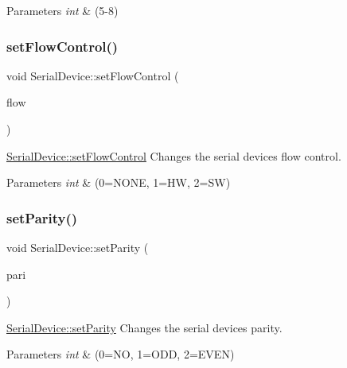 \begin{DoxyParams}{Parameters}
{\em int} & (5-\/8) \\
\hline
\end{DoxyParams}
\hypertarget{class_serial_device_a74968289347c6ede64587287bb0cf699}{}\label{class_serial_device_a74968289347c6ede64587287bb0cf699} 
\subsubsection{\texorpdfstring{set\+Flow\+Control()}{setFlowControl()}}
{\footnotesize\ttfamily void Serial\+Device\+::set\+Flow\+Control (\begin{DoxyParamCaption}\item[{int}]{flow }\end{DoxyParamCaption})}



\hyperlink{class_serial_device_a74968289347c6ede64587287bb0cf699}{Serial\+Device\+::set\+Flow\+Control} Changes the serial device\textquotesingle{}s flow control. 


\begin{DoxyParams}{Parameters}
{\em int} & (0=N\+O\+NE, 1=HW, 2=SW) \\
\hline
\end{DoxyParams}
\hypertarget{class_serial_device_a91e293977d5401ededf350e19846b5a1}{}\label{class_serial_device_a91e293977d5401ededf350e19846b5a1} 
\subsubsection{\texorpdfstring{set\+Parity()}{setParity()}}
{\footnotesize\ttfamily void Serial\+Device\+::set\+Parity (\begin{DoxyParamCaption}\item[{int}]{pari }\end{DoxyParamCaption})}



\hyperlink{class_serial_device_a91e293977d5401ededf350e19846b5a1}{Serial\+Device\+::set\+Parity} Changes the serial device\textquotesingle{}s parity. 


\begin{DoxyParams}{Parameters}
{\em int} & (0=NO, 1=O\+DD, 2=E\+V\+EN) \\
\hline
\end{DoxyParams}
\hypertarget{class_serial_device_a1440b389cc1bba66e9854a32a5807a8f}{}\label{class_serial_device_a1440b389cc1bba66e9854a32a5807a8f} 
